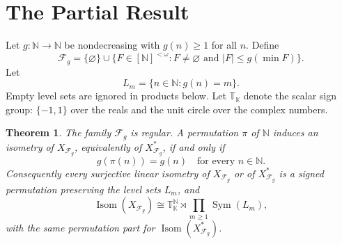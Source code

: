 \documentclass[11pt]{article}
\newtheorem{theorem}{Theorem}
\newcommand{\N}{\mathbb{N}}
\newcommand{\F}{\mathcal{F}}
\newcommand{\K}{\mathbb{K}}
\newcommand{\T}{\mathbb{T}}
\newcommand{\Isom}{\operatorname{Isom}}
\newcommand{\Sym}{\operatorname{Sym}}
\begin{document}
\section*{The Partial Result}

Let $g:\N\to\N$ be nondecreasing with $g(n)\geq 1$ for all $n$.  Define
\[
  \F_g=\{\varnothing\}\cup
  \{F\in[\N]^{<\omega}: F\neq\varnothing \text{ and } |F|\leq g(\min F)\}.
\]
Let
\[
  L_m=\{n\in\N: g(n)=m\}.
\]
Empty level sets are ignored in products below.  Let $\T_\K$ denote the
scalar sign group: $\{-1,1\}$ over the reals and the unit circle over the
complex numbers.

\begin{theorem}
\label{thm:threshold}
The family $\F_g$ is regular.  A permutation $\pi$ of $\N$ induces an isometry
of $X_{\F_g}$, equivalently of $X_{\F_g}^*$, if and only if
\[
  g(\pi(n))=g(n)\quad\text{for every }n\in\N.
\]
Consequently every surjective linear isometry of $X_{\F_g}$ or of
$X_{\F_g}^*$ is a signed permutation preserving the level sets $L_m$, and
\[
  \Isom(X_{\F_g})\cong \T_\K^{\N}\rtimes \prod_{m\geq 1}\Sym(L_m),
\]
with the same permutation part for $\Isom(X_{\F_g}^*)$.
\end{theorem}
\end{document}
